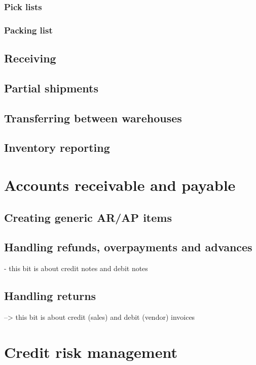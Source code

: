 \subsection{Pick lists}
\subsection{Packing list}

\section{Receiving}

\section{Partial shipments}

\section{Transferring between warehouses}

\section{Inventory reporting}



\chapter{Accounts receivable and payable}

\section{Creating generic AR/AP items}

\section{Handling refunds, overpayments and advances}

- this bit is about credit notes and debit notes

\section{Handling returns}

--> this bit is about credit (sales) and debit (vendor) invoices

\chapter{Credit risk management}
\label{cha:credit-risk-management}

